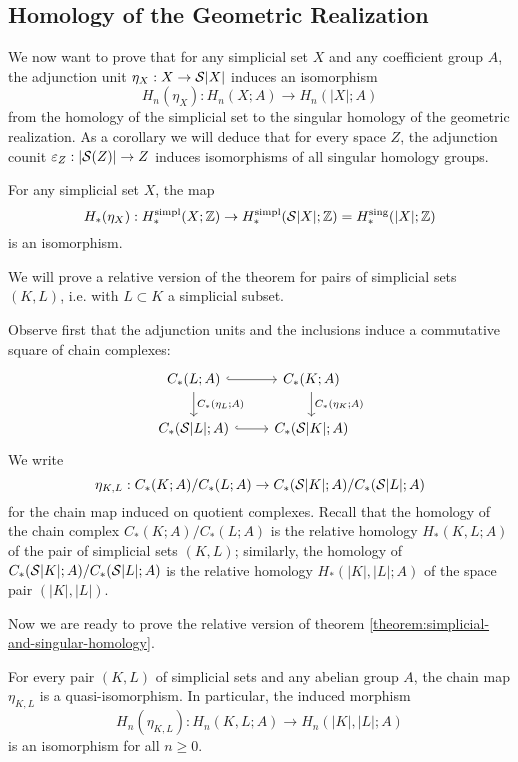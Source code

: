\subsection{Homology of the Geometric Realization}

We now want to prove that for any simplicial set $X$ and any coefficient group $A$, the adjunction unit $\eta_X:X\to\S|X|$ induces an isomorphism
\[H_n(\eta_X):H_n(X;A)\to H_n(|X|;A)\]
from the homology of the simplicial set to the singular homology of the geometric realization. As a corollary we will deduce that for every space $Z$, the adjunction counit $\epsilon_Z:|\S(Z)|\to Z$ induces isomorphisms of all singular homology groups.

\begin{theorem}\label{theorem:simplicial-and-singular-homology}
For any simplicial set $X$, the map
\[H_*(\eta_X):H^\simpl_*(X;\Z)\to H^\simpl_*(\S|X|;\Z)=H^\sing_*(|X|;\Z)\]
is an isomorphism.
\end{theorem}

We will prove a relative version of the theorem for pairs of simplicial sets $(K,L)$, i.e. with $L\subset K$ a simplicial subset.

Observe first that the adjunction units and the inclusions induce a commutative square of chain complexes:
\[
\begin{tikzcd}
C_*(L;A) \ar[d,"C_*(\eta_L;A)"] \ar[r,hook] & C_*(K;A) \ar[d,"C_*(\eta_K;A)"]\\
C_*(\S|L|;A) \ar[r,hook] & C_*(\S|K|;A)
\end{tikzcd}
\]
We write
\[\eta_{K,
L}:C_*(K;A)/C_*(L;A)\to C_*(\S|K|;A)/C_*(\S|L|;A)\]
for the chain map induced on quotient complexes. Recall that the homology of the chain complex $C_*(K;A)/C_*(L;A)$ is the relative homology $H_*(K,L;A)$ of the pair of simplicial sets $(K,L)$; similarly, the homology of $C_*(\S|K|;A)/C_*(\S|L|;A)$ is the relative homology $H_*(|K|,|L|;A)$ of the space pair $(|K|,|L|)$.

Now we are ready to prove the relative version of theorem \ref{theorem:simplicial-and-singular-homology}.

\begin{theorem}\label{theorem:simplicial-and-singular-relative-homology}
For every pair $(K,L)$ of simplicial sets and any abelian group $A$, the chain map $\eta_{K,L}$ is a quasi-isomorphism. In particular, the induced morphism
\[H_n(\eta_{K,L}):H_n(K,L;A)\to H_n(|K|,|L|;A)\]
is an isomorphism for all $n\ge0$.
\end{theorem}


